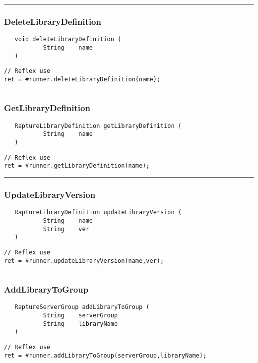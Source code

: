 \rule{15cm}{2pt}
\subsubsection{DeleteLibraryDefinition}
\label{Api:DeleteLibraryDefinition}
\begin{verbatim}
   void deleteLibraryDefinition (
           String    name
   )
\end{verbatim}
\begin{lstlisting}[language=reflex]
// Reflex use
ret = #runner.deleteLibraryDefinition(name);
\end{lstlisting}



\rule{15cm}{2pt}
\subsubsection{GetLibraryDefinition}
\label{Api:GetLibraryDefinition}
\begin{verbatim}
   RaptureLibraryDefinition getLibraryDefinition (
           String    name
   )
\end{verbatim}
\begin{lstlisting}[language=reflex]
// Reflex use
ret = #runner.getLibraryDefinition(name);
\end{lstlisting}



\rule{15cm}{2pt}
\subsubsection{UpdateLibraryVersion}
\label{Api:UpdateLibraryVersion}
\begin{verbatim}
   RaptureLibraryDefinition updateLibraryVersion (
           String    name
           String    ver
   )
\end{verbatim}
\begin{lstlisting}[language=reflex]
// Reflex use
ret = #runner.updateLibraryVersion(name,ver);
\end{lstlisting}



\rule{15cm}{2pt}
\subsubsection{AddLibraryToGroup}
\label{Api:AddLibraryToGroup}
\begin{verbatim}
   RaptureServerGroup addLibraryToGroup (
           String    serverGroup
           String    libraryName
   )
\end{verbatim}
\begin{lstlisting}[language=reflex]
// Reflex use
ret = #runner.addLibraryToGroup(serverGroup,libraryName);
\end{lstlisting}



